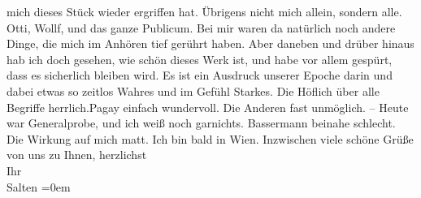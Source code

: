 \begin{ledgroupsized}[t]{13cm}
               mich dieses Stück wieder ergriffen hat. Übrigens nicht mich allein, sondern alle. Otti, Wollf, und das ganze Publicum. Bei mir waren da natürlich noch andere Dinge,
               die mich im Anhören tief gerührt haben. Aber daneben und drüber hinaus hab ich doch
               gesehen, wie schön dieses Werk ist, und habe vor allem gespürt, dass es sicherlich
               bleiben wird. Es ist ein Ausdruck unserer Epoche darin und dabei etwas so zeitlos
               Wahres und im Gefühl Starkes. Die Höflich über
               alle Begriffe herrlich.Pagay einfach
               wundervoll. Die Anderen fast unmöglich. – Heute war Generalprobe, und ich weiß noch garnichts. Bassermann beinahe schlecht. Die Wirkung auf
               mich matt. Ich bin bald in Wien. \pend
           \pstart
           Inzwischen viele schöne Grüße von uns zu Ihnen, herzlichst {\\[\baselineskip]}Ihr {\\[\baselineskip]}\spacefill\mbox{Salten}\pend
           \leftskip=0em{}
         
         \endnumbering{}\end{ledgroupsized}\begin{anhang}\end{anhang}\newcommand{\dateiname}{L03513}\newcommand{\titel}{Felix Salten an Arthur Schnitzler, 15. 10. 1907}\newcommand{\editorInnen}{Martin Anton Müller und Laura Untner}
      